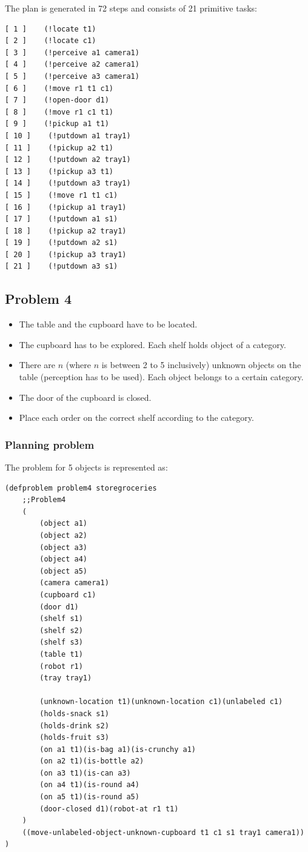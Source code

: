 \documentclass[paper=a4, fontsize=11pt]{scrartcl}
\begin{document}
The plan is generated in 72 steps and consists of 21 primitive tasks: \\

\begin{lstlisting}
[ 1 ]    (!locate t1)
[ 2 ]    (!locate c1)
[ 3 ]    (!perceive a1 camera1)
[ 4 ]    (!perceive a2 camera1)
[ 5 ]    (!perceive a3 camera1)
[ 6 ]    (!move r1 t1 c1)
[ 7 ]    (!open-door d1)
[ 8 ]    (!move r1 c1 t1)
[ 9 ]    (!pickup a1 t1)
[ 10 ]    (!putdown a1 tray1)
[ 11 ]    (!pickup a2 t1)
[ 12 ]    (!putdown a2 tray1)
[ 13 ]    (!pickup a3 t1)
[ 14 ]    (!putdown a3 tray1)
[ 15 ]    (!move r1 t1 c1)
[ 16 ]    (!pickup a1 tray1)
[ 17 ]    (!putdown a1 s1)
[ 18 ]    (!pickup a2 tray1)
[ 19 ]    (!putdown a2 s1)
[ 20 ]    (!pickup a3 tray1)
[ 21 ]    (!putdown a3 s1)
\end{lstlisting}


	\subsection{Problem 4}

		\begin{itemize}
			\item The table and the cupboard have to be located.
			\item The cupboard has to be explored. Each shelf holds object of a category.
			\item There are $n$ (where $n$ is between 2 to 5 inclusively) unknown objects on the table (perception has to be used). Each object belongs to a certain category.
			\item The door of the cupboard is closed.
			\item Place each order on the correct shelf according to the category.
		\end{itemize}

	\subsubsection*{Planning problem}

	The problem for 5 objects is represented as: \\

	\begin{lstlisting}
(defproblem problem4 storegroceries
	;;Problem4
	(
		(object a1)
		(object a2)
		(object a3)
		(object a4)
		(object a5)
		(camera camera1)
		(cupboard c1)
		(door d1)
		(shelf s1)
		(shelf s2)
		(shelf s3)
		(table t1)
		(robot r1)
		(tray tray1)

		(unknown-location t1)(unknown-location c1)(unlabeled c1)
		(holds-snack s1)
		(holds-drink s2)
		(holds-fruit s3)
		(on a1 t1)(is-bag a1)(is-crunchy a1)
		(on a2 t1)(is-bottle a2)
		(on a3 t1)(is-can a3)
		(on a4 t1)(is-round a4)
		(on a5 t1)(is-round a5)
		(door-closed d1)(robot-at r1 t1)
	)
	((move-unlabeled-object-unknown-cupboard t1 c1 s1 tray1 camera1))
)
	\end{lstlisting}
\end{document}
